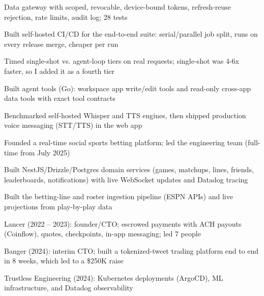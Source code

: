 \documentclass[print]{jack-resume}
\begin{document}
\begin{tightemize}
    \item Data gateway with scoped, revocable, device-bound tokens, refresh-reuse rejection, rate limits, audit log; 28 tests
    \item Built self-hosted CI/CD for the end-to-end suite: serial/parallel job split, runs on every release merge, cheaper per run
    \item Timed single-shot vs. agent-loop tiers on real requests; single-shot was 4-6x faster, so I added it as a fourth tier
    \item Built agent tools (Go): workspace app write/edit tools and read-only cross-app data tools with exact tool contracts
    \item Benchmarked self-hosted Whisper and TTS engines, then shipped production voice messaging (STT/TTS) in the web app
\end{tightemize}
\sectionsep

\begin{tightemize}
    \item Founded a real-time social sports betting platform; led the engineering team (full-time from July 2025)
    \item Built NestJS/Drizzle/Postgres domain services (games, matchups, lines, friends, leaderboards, notifications) with live WebSocket updates and Datadog tracing
    \item Built the betting-line and roster ingestion pipeline (ESPN APIs) and live projections from play-by-play data
\end{tightemize}
\sectionsep

\begin{tightemize}
    \item Lancer (2022 -- 2023): founder/CTO; escrowed payments with ACH payouts (Coinflow), quotes, checkpoints, in-app messaging; led 7 people
    \item Banger (2024): interim CTO; built a tokenized-tweet trading platform end to end in 8 weeks, which led to a \$250K raise
    \item Trustless Engineering (2024): Kubernetes deployments (ArgoCD), ML infrastructure, and Datadog observability
\end{tightemize}
\sectionsep
\end{document}
